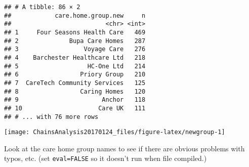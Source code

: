 \documentclass[]{article}
\newenvironment{Shaded}{\begin{snugshade}}{\end{snugshade}}
\newcommand{\KeywordTok}[1]{\textcolor[rgb]{0.13,0.29,0.53}{\textbf{{#1}}}}
\newcommand{\DataTypeTok}[1]{\textcolor[rgb]{0.13,0.29,0.53}{{#1}}}
\newcommand{\DecValTok}[1]{\textcolor[rgb]{0.00,0.00,0.81}{{#1}}}
\newcommand{\StringTok}[1]{\textcolor[rgb]{0.31,0.60,0.02}{{#1}}}
\newcommand{\OtherTok}[1]{\textcolor[rgb]{0.56,0.35,0.01}{{#1}}}
\newcommand{\NormalTok}[1]{{#1}}
\begin{document}
\begin{Shaded}
\end{Shaded}

\begin{verbatim}
## # A tibble: 86 × 2
##            care.home.group.new     n
##                          <chr> <int>
## 1     Four Seasons Health Care   469
## 2              Bupa Care Homes   287
## 3                  Voyage Care   276
## 4    Barchester Healthcare Ltd   218
## 5                   HC-One Ltd   214
## 6                 Priory Group   210
## 7  CareTech Community Services   125
## 8                 Caring Homes   120
## 9                       Anchor   118
## 10                     Care UK   111
## # ... with 76 more rows
\end{verbatim}

\begin{center}\texttt{[image: ChainsAnalysis20170124\_files/figure-latex/newgroup-1]} \end{center}

Look at the care home group names to see if there are obvious problems
with typos, etc. (set \texttt{eval=FALSE} so it doesn't run when file
compiled.)
\end{document}
